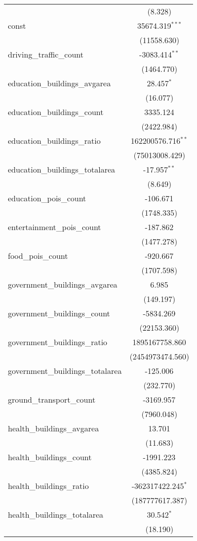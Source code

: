 \begin{table}[!htbp]
\begin{tabular}{@{\extracolsep{5pt}}lc}
  & (8.328) \\
 const & 35674.319$^{***}$ \\
  & (11558.630) \\
 driving_traffic_count & -3083.414$^{**}$ \\
  & (1464.770) \\
 education_buildings_avgarea & 28.457$^{*}$ \\
  & (16.077) \\
 education_buildings_count & 3335.124$^{}$ \\
  & (2422.984) \\
 education_buildings_ratio & 162200576.716$^{**}$ \\
  & (75013008.429) \\
 education_buildings_totalarea & -17.957$^{**}$ \\
  & (8.649) \\
 education_pois_count & -106.671$^{}$ \\
  & (1748.335) \\
 entertainment_pois_count & -187.862$^{}$ \\
  & (1477.278) \\
 food_pois_count & -920.667$^{}$ \\
  & (1707.598) \\
 government_buildings_avgarea & 6.985$^{}$ \\
  & (149.197) \\
 government_buildings_count & -5834.269$^{}$ \\
  & (22153.360) \\
 government_buildings_ratio & 1895167758.860$^{}$ \\
  & (2454973474.560) \\
 government_buildings_totalarea & -125.006$^{}$ \\
  & (232.770) \\
 ground_transport_count & -3169.957$^{}$ \\
  & (7960.048) \\
 health_buildings_avgarea & 13.701$^{}$ \\
  & (11.683) \\
 health_buildings_count & -1991.223$^{}$ \\
  & (4385.824) \\
 health_buildings_ratio & -362317422.245$^{*}$ \\
  & (187777617.387) \\
 health_buildings_totalarea & 30.542$^{*}$ \\
  & (18.190) \\

\end{tabular}
\end{table}
